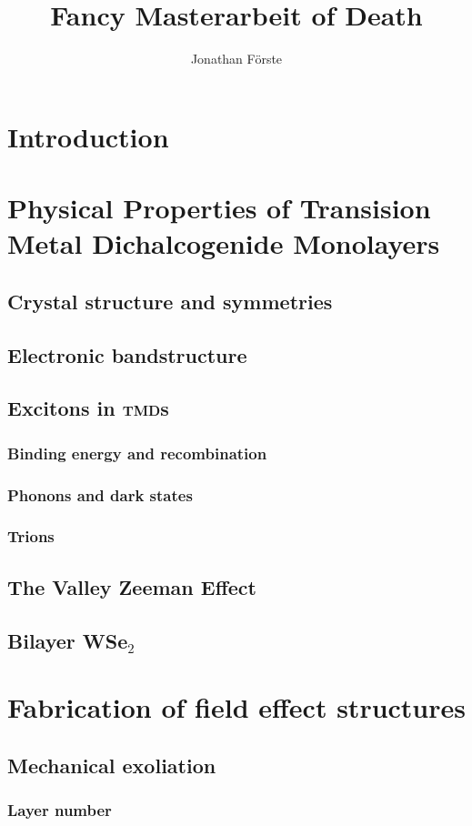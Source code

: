 \documentclass{scrbook}
\title{Fancy Masterarbeit of Death}
\author{Jonathan Förste}
\begin{document}
\maketitle
\tableofcontents
\chapter{Introduction}
\chapter{Physical Properties of Transision Metal Dichalcogenide Monolayers}
	\section{Crystal structure and symmetries}
	\section{Electronic bandstructure}
	\section{Excitons in \textsc{tmd}s}
		\subsection{Binding energy and recombination}
		\subsection{Phonons and dark states}
		\subsection{Trions}
	\section{The Valley Zeeman Effect}
	\section{Bilayer WSe$_2$}
\chapter{Fabrication of field effect structures}
	\section{Mechanical exoliation}
		\subsection{Layer number}
\end{document}
